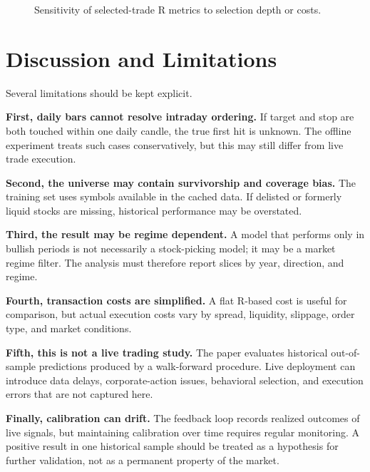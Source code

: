 \documentclass[11pt]{article}
\begin{document}
\begin{figure}[ht]
\centering
{}
\caption{Sensitivity of selected-trade R metrics to selection depth or costs.}
\label{fig:sensitivity}
\end{figure}

\section{Discussion and Limitations}

Several limitations should be kept explicit.

\textbf{First, daily bars cannot resolve intraday ordering.} If target and stop
are both touched within one daily candle, the true first hit is unknown. The
offline experiment treats such cases conservatively, but this may still differ
from live trade execution.

\textbf{Second, the universe may contain survivorship and coverage bias.} The
training set uses symbols available in the cached data. If delisted or formerly
liquid stocks are missing, historical performance may be overstated.

\textbf{Third, the result may be regime dependent.} A model that performs only
in bullish periods is not necessarily a stock-picking model; it may be a market
regime filter. The analysis must therefore report slices by year, direction,
and regime.

\textbf{Fourth, transaction costs are simplified.} A flat R-based cost is useful
for comparison, but actual execution costs vary by spread, liquidity, slippage,
order type, and market conditions.

\textbf{Fifth, this is not a live trading study.} The paper evaluates historical
out-of-sample predictions produced by a walk-forward procedure. Live deployment
can introduce data delays, corporate-action issues, behavioral selection, and
execution errors that are not captured here.

\textbf{Finally, calibration can drift.} The feedback loop records realized
outcomes of live signals, but maintaining calibration over time requires regular
monitoring. A positive result in one historical sample should be treated as a
hypothesis for further validation, not as a permanent property of the market.
\end{document}
